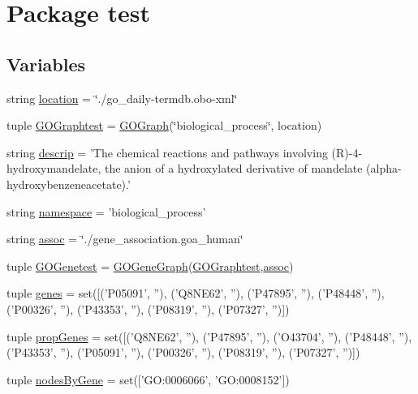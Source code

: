 \hypertarget{namespacetest}{
\section{Package test}
\label{namespacetest}
}
\subsection*{Variables}
\begin{DoxyCompactItemize}
\item 
string \hyperlink{namespacetest_a4ee7d63d9426ae32ba96ad2f0e171511}{location} = \char`\"{}./go\_\-daily-\/termdb.obo-\/xml\char`\"{}
\item 
tuple \hyperlink{namespacetest_a49256f3800de70e9aabf11ea0c3bb8e1}{GOGraphtest} = \hyperlink{class_g_o_graph_1_1_g_o_graph}{GOGraph}(\char`\"{}biological\_\-process\char`\"{}, location)
\item 
string \hyperlink{namespacetest_afe7b4432163ad853f4fcd650d0ecab8c}{descrip} = 'The chemical reactions and pathways involving (R)-\/4-\/hydroxymandelate, the anion of a hydroxylated derivative of mandelate (alpha-\/hydroxybenzeneacetate).'
\item 
string \hyperlink{namespacetest_a1429061289985226ca44c2e4e888d77e}{namespace} = 'biological\_\-process'
\item 
string \hyperlink{namespacetest_adb8b1e2a5df72522e42bc012571e75cd}{assoc} = \char`\"{}./gene\_\-association.goa\_\-human\char`\"{}
\item 
tuple \hyperlink{namespacetest_ab48a47ac8dcf21d32cff24c492f085c1}{GOGenetest} = \hyperlink{class_g_o_gene_graph_1_1_g_o_gene_graph}{GOGeneGraph}(\hyperlink{namespacetest_a49256f3800de70e9aabf11ea0c3bb8e1}{GOGraphtest},\hyperlink{namespacetest_adb8b1e2a5df72522e42bc012571e75cd}{assoc})
\item 
tuple \hyperlink{namespacetest_a836657c6fd789469b5cbdd3c88513f7f}{genes} = set(\mbox{[}('P05091', ''), ('Q8NE62', ''), ('P47895', ''), ('P48448', ''), ('P00326', ''), ('P43353', ''), ('P08319', ''), ('P07327', '')\mbox{]})
\item 
tuple \hyperlink{namespacetest_a6b190968f9c7fc0593c63df10224e21a}{propGenes} = set(\mbox{[}('Q8NE62', ''), ('P47895', ''), ('O43704', ''), ('P48448', ''), ('P43353', ''), ('P05091', ''), ('P00326', ''), ('P08319', ''), ('P07327', '')\mbox{]})
\item 
tuple \hyperlink{namespacetest_aa8cc3a0b86b4a37acf878753845ac845}{nodesByGene} = set(\mbox{[}'GO:0006066', 'GO:0008152'\mbox{]})

\end{DoxyCompactItemize}
